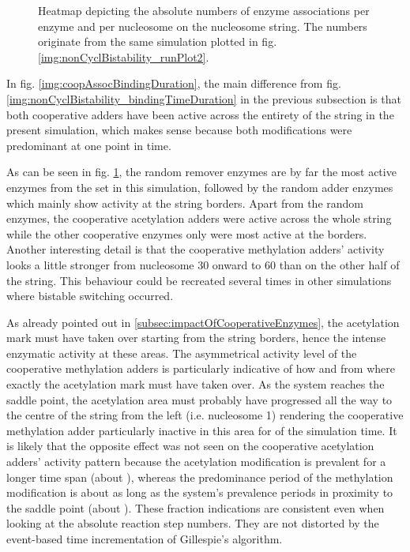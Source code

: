             \begin{figure}[htpb!]
                \centering
                \caption{Heatmap depicting the absolute numbers of enzyme associations per enzyme and per nucleosome on the nucleosome string. The numbers originate from the same simulation plotted in fig. \ref{img:nonCyclBistability_runPlot2}.}
                \label{img:coopAssocBindingNumbers} 
            \end{figure}

            In fig. \ref{img:coopAssocBindingDuration}, the main difference from fig. \ref{img:nonCyclBistability_bindingTimeDuration} in the previous subsection is that both cooperative adders have been active across the entirety of the string in the present simulation, which makes sense because both modifications were predominant at one point in time.

            As can be seen in fig. \ref{img:coopAssocBindingNumbers}, the random remover enzymes are by far the most active enzymes from the set in this simulation, followed by the random adder enzymes which mainly show activity at the string borders. Apart from the random enzymes, the cooperative acetylation adders were active across the whole string while the other cooperative enzymes only were most active at the borders. Another interesting detail is that the cooperative methylation adders' activity looks a little stronger from nucleosome 30 onward to 60 than on the other half of the string. This behaviour could be recreated several times in other simulations where bistable switching occurred.

            As already pointed out in \ref{subsec:impactOfCooperativeEnzymes}, the acetylation mark must have taken over starting from the string borders, hence the intense enzymatic activity at these areas. The asymmetrical activity level of the cooperative methylation adders is particularly indicative of how and from where exactly the acetylation mark must have taken over. As the system reaches the saddle point, the acetylation area must probably have progressed all the way to the centre of the string from the left (i.e. nucleosome 1) rendering the cooperative methylation adder particularly inactive in this area for  of the simulation time. It is likely that the opposite effect was not seen on the cooperative acetylation adders' activity pattern because the acetylation modification is prevalent for a longer time span (about ), whereas the predominance period of the methylation modification is about as long as the system's prevalence periods in  proximity to the saddle point (about ). These fraction indications are consistent even when looking at the absolute reaction step numbers. They are not distorted by the event-based time incrementation of Gillespie's algorithm.
